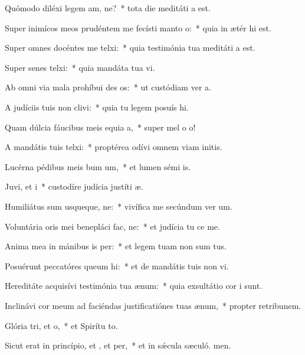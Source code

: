 \item Quómodo diléxi legem am, ne?~* tota die meditáti a est.
\item Super inimícos meos prudéntem me fecísti manto o:~* quia in ætér hi est.
\item Super omnes docéntes me telxi:~* quia testimónia tua meditáti a est.
\item Super senes telxi:~* quia mandáta tua vi.
\item Ab omni via mala prohíbui des os:~* ut custódiam ver a.
\item A judíciis tuis non clivi:~* quia tu legem posuís hi.
\item Quam dúlcia fáucibus meis equia a,~* super mel o o!
\item A mandátis tuis telxi:~* proptérea odívi omnem viam initis.
\item Lucérna pédibus meis bum um,~* et lumen sémi is.
\item Juvi, et i~* custodíre judícia justíti æ.
\item Humiliátus sum usqueque, ne:~* vivífica me secúndum ver um.
\item Voluntária oris mei benepláci fac, ne:~* et judícia tu ce me.
\item Anima mea in mánibus is per:~* et legem tuam non sum tus.
\item Posuérunt peccatóres queum hi:~* et de mandátis tuis non vi.
\item Hereditáte acquisívi testimónia tua  ænum:~* quia exsultátio cor i sunt.
\item Inclinávi cor meum ad faciéndas justificatiónes tuas  ænum,~* propter retribunem.
\item Glória tri, et o,~* et Spirítu to.
\item Sicut erat in princípio, et , et per,~* et in sǽcula sæculó. men.
